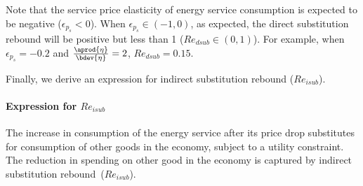 Note that the service price elasticity of energy service consumption is
expected to be negative ($\epsilon_{p_s} < 0$).
When $\epsilon_{p_s} \in (-1, 0)$, as expected,
the direct substitution rebound will be positive but less than 1 ($Re_{dsub} \in (0, 1)$).
For example, when $\epsilon_{p_s} = -0.2$ and $\frac{\aprod{\eta}}{\bdev{\eta}} = 2$, 
$Re_{dsub} = 0.15$.

Finally, we derive an expression for indirect substitution rebound ($Re_{isub}$).


\paragraph{Expression for $Re_{isub}$} 
\label{sec:Re_isub}

The increase in consumption of the energy service after its price drop
substitutes for consumption of other goods in the economy, 
subject to a utility constraint. 
The reduction in spending on other good in the economy 
is captured by indirect substitution rebound~($Re_{isub}$).

